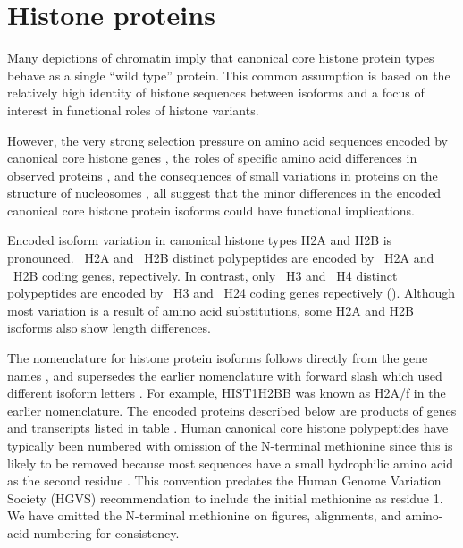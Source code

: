 \section{Histone proteins}
  Many depictions of chromatin imply that
  canonical core histone protein types behave as a single ``wild type'' protein.
  This common assumption is based on the relatively high identity of histone sequences
  between isoforms and a focus of interest in functional roles of histone variants.

  However, the very strong selection pressure on
  amino acid sequences encoded by canonical core histone genes \citep{NeiRooney2005},
  the roles of specific amino acid differences in observed proteins \citep{MazeAllis2014},
  and the consequences of small variations in proteins on the structure of nucleosomes 
  \citep{KurumizakaCOSB2013},
  all suggest that the minor differences in the encoded canonical core histone protein isoforms
  could have functional implications.

  Encoded isoform variation in canonical histone types H2A and H2B is pronounced.
  \HTwoAUniqueProteins{}~H2A and \HTwoBUniqueProteins{}~H2B distinct polypeptides
  are encoded by \HTwoACodingGenes{}~H2A and \HTwoBCodingGenes{}~H2B coding genes, repectively.
  In contrast, only \HThreeUniqueProteins{}~H3 and \HFourUniqueProteins{}~H4
  distinct polypeptides are encoded by \HThreeCodingGenes{}~H3 and \HFourCodingGenes{}~H24
  coding genes repectively ().
  Although most variation is a result of amino acid substitutions,
  some H2A and H2B isoforms also show length differences.

  The nomenclature for histone protein isoforms follows directly
  from the gene names \citep{Marzluff02},
  and supersedes the earlier nomenclature with forward slash which used different isoform letters
  \citep{AlbigGenomics1997,AlbigHumangen1997}.
  For example, HIST1H2BB was known as H2A/f in the earlier nomenclature.
  The encoded proteins described below are products of genes and transcripts listed
  in table .
  Human canonical core histone polypeptides have typically been numbered
  with omission of the N-terminal methionine
  since this is likely to be removed because most sequences have
  a small hydrophilic amino acid as the second residue \citep{XiaoPeiBiochem2010}.
  This convention predates the Human Genome Variation Society (HGVS) recommendation
  to include the initial methionine as residue 1.
  We have omitted the N-terminal methionine on figures, alignments,
  and amino-acid numbering for consistency.

